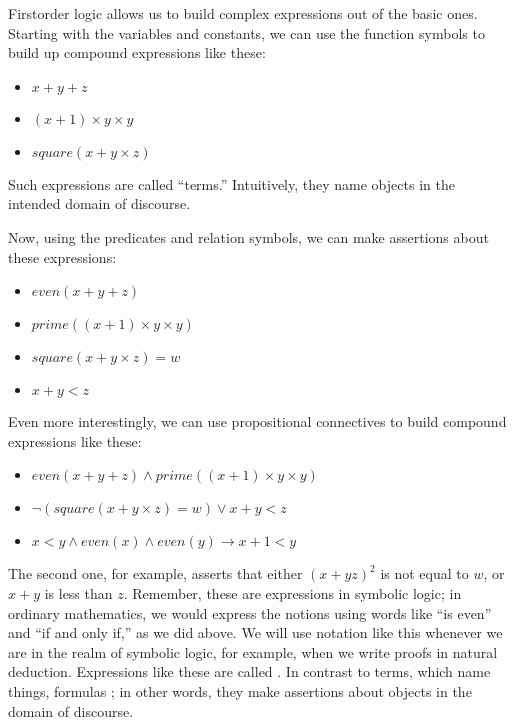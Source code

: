 \documentclass[letterpaper,10pt,english]{sphinxmanual}
\begin{document}
\sphinxAtStartPar
First\sphinxhyphen{}order logic allows us to build complex expressions out of the basic ones. Starting with the variables and constants, we can use the function symbols to build up compound expressions like these:
\begin{itemize}
\item {} 
\sphinxAtStartPar
\(x + y + z\)

\item {} 
\sphinxAtStartPar
\((x + 1) \times y \times y\)

\item {} 
\sphinxAtStartPar
\(\mathit{square} (x + y \times z)\)

\end{itemize}

\sphinxAtStartPar
Such expressions are called “terms.” Intuitively, they name objects in the intended domain of discourse.

\sphinxAtStartPar
Now, using the predicates and relation symbols, we can make assertions about these expressions:
\begin{itemize}
\item {} 
\sphinxAtStartPar
\(\mathit{even}(x + y + z)\)

\item {} 
\sphinxAtStartPar
\(\mathit{prime}((x + 1) \times y \times y)\)

\item {} 
\sphinxAtStartPar
\(\mathit{square}(x + y \times z) = w\)

\item {} 
\sphinxAtStartPar
\(x + y < z\)

\end{itemize}

\sphinxAtStartPar
Even more interestingly, we can use propositional connectives to build compound expressions like these:
\begin{itemize}
\item {} 
\sphinxAtStartPar
\(\mathit{even}(x + y + z) \wedge \mathit{prime}((x + 1) \times y \times y)\)

\item {} 
\sphinxAtStartPar
\(\neg (\mathit{square} (x + y \times z) = w) \vee x + y < z\)

\item {} 
\sphinxAtStartPar
\(x < y \wedge \mathit{even}(x) \wedge \mathit{even}(y) \to x + 1 < y\)

\end{itemize}

\sphinxAtStartPar
The second one, for example, asserts that either \((x + yz)^2\) is not equal to \(w\), or \(x + y\) is less than \(z\). Remember, these are expressions in symbolic logic; in ordinary mathematics, we would express the notions using words like “is even” and “if and only if,” as we did above. We will use notation like this whenever we are in the realm of symbolic logic, for example, when we write proofs in natural deduction. Expressions like these are called . In contrast to terms, which name things, formulas ; in other words, they make assertions about objects in the domain of discourse.
\end{document}
